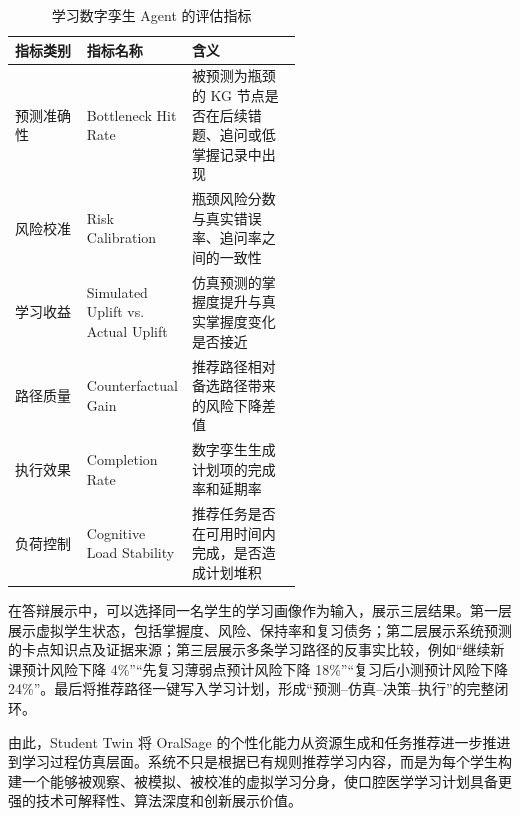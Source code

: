 \begin{table}[H]
  \centering
  \caption{学习数字孪生 Agent 的评估指标}
  \label{tab:student-twin-evaluation}
  \begin{tabularx}{\linewidth}{p{0.25\linewidth}p{0.32\linewidth}X}
    \toprule
    指标类别 & 指标名称 & 含义 \\
    \midrule
    预测准确性 & Bottleneck Hit Rate & 被预测为瓶颈的 KG 节点是否在后续错题、追问或低掌握记录中出现 \\
    风险校准 & Risk Calibration & 瓶颈风险分数与真实错误率、追问率之间的一致性 \\
    学习收益 & Simulated Uplift vs. Actual Uplift & 仿真预测的掌握度提升与真实掌握度变化是否接近 \\
    路径质量 & Counterfactual Gain & 推荐路径相对备选路径带来的风险下降差值 \\
    执行效果 & Completion Rate & 数字孪生生成计划项的完成率和延期率 \\
    负荷控制 & Cognitive Load Stability & 推荐任务是否在可用时间内完成，是否造成计划堆积 \\
    \bottomrule
  \end{tabularx}
\end{table}

在答辩展示中，可以选择同一名学生的学习画像作为输入，展示三层结果。第一层展示虚拟学生状态，包括掌握度、风险、保持率和复习债务；第二层展示系统预测的卡点知识点及证据来源；第三层展示多条学习路径的反事实比较，例如“继续新课预计风险下降 4\%”“先复习薄弱点预计风险下降 18\%”“复习后小测预计风险下降 24\%”。最后将推荐路径一键写入学习计划，形成“预测--仿真--决策--执行”的完整闭环。

由此，Student Twin 将 OralSage 的个性化能力从资源生成和任务推荐进一步推进到学习过程仿真层面。系统不只是根据已有规则推荐学习内容，而是为每个学生构建一个能够被观察、被模拟、被校准的虚拟学习分身，使口腔医学学习计划具备更强的技术可解释性、算法深度和创新展示价值。
